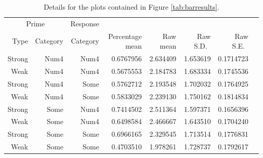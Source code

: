 \documentclass[10pt]{article}
\begin{document}
\begin{table}[ht]
  \centering
  \begin{tabular}{rrr|rrrrr}
    \hline
    \multicolumn{2}{c}{Prime} & Response & & & & \\
    Type & Category & Category  & Percentage mean & Raw mean & Raw S.D.\ & Raw S.E.\ \\
    \hline
 Strong & Num4 &  Num4 &   0.6767956 &  2.634409 & 1.653619 & 0.1714723     \\
   Weak & Num4 &  Num4 &   0.5675553 &  2.184783 & 1.683334 & 0.1745536     \\
 Strong & Num4 &  Some &   0.5762712 &  2.193548 & 1.702032 & 0.1764925     \\
   Weak & Num4 &  Some &   0.5833029 &  2.239130 & 1.750162 & 0.1814834     \\
 Strong & Some &  Num4 &   0.7414502 &  2.511364 & 1.597371 & 0.1656396     \\
   Weak & Some &  Num4 &   0.6498584 &  2.466667 & 1.643510 & 0.1704240     \\
 Strong & Some &  Some &   0.6966165 &  2.329545 & 1.713514 & 0.1776831     \\
    Weak & Some &  Some &   0.4703510 &  1.978261 & 1.728737 & 0.1792617     \\
    \hline
  \end{tabular}
  \caption{Details for the plots contained in Figure \ref{tab:barresults}.}
\end{table}
\end{document}
